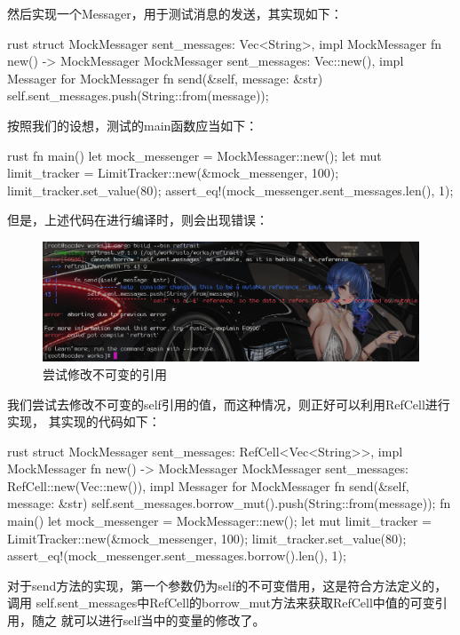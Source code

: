 然后实现一个Messager，用于测试消息的发送，其实现如下：
\begin{code-block}{rust}
struct MockMessager {
    sent_messages: Vec<String>,
}
impl MockMessager {
    fn new() -> MockMessager {
        MockMessager {
            sent_messages: Vec::new(),
        }
    }
}
impl Messager for MockMessager {
    fn send(&self, message: &str) {
        self.sent_messages.push(String::from(message));
    }
}
\end{code-block}

按照我们的设想，测试的main函数应当如下：
\begin{code-block}{rust}
fn main() {
    let mock_messenger = MockMessager::new();
    let mut limit_tracker = LimitTracker::new(&mock_messenger, 100);
    limit_tracker.set_value(80);
    assert_eq!(mock_messenger.sent_messages.len(), 1);
}
\end{code-block}

但是，上述代码在进行编译时，则会出现错误：
\begin{figure}[H]
  \centering
  \includegraphics[width=\linewidth]{rust_ref_error.png}
  \caption{尝试修改不可变的引用}
  \label{fig:rust_ref_error}
\end{figure}

我们尝试去修改不可变的self引用的值，而这种情况，则正好可以利用RefCell进行实现，
其实现的代码如下：
\begin{code-block}{rust}
struct MockMessager {
    sent_messages: RefCell<Vec<String>>,
}
impl MockMessager {
    fn new() -> MockMessager {
        MockMessager {
            sent_messages: RefCell::new(Vec::new()),
        }
    }
}
impl Messager for MockMessager {
    fn send(&self, message: &str) {
        self.sent_messages.borrow_mut().push(String::from(message));
    }
}
fn main() {
    let mock_messenger = MockMessager::new();
    let mut limit_tracker = LimitTracker::new(&mock_messenger, 100);
    limit_tracker.set_value(80);
    assert_eq!(mock_messenger.sent_messages.borrow().len(), 1);
}
\end{code-block}
对于send方法的实现，第一个参数仍为self的不可变借用，这是符合方法定义的，调用
self.sent\_messages中RefCell的borrow\_mut方法来获取RefCell中值的可变引用，随之
就可以进行self当中的变量的修改了。

